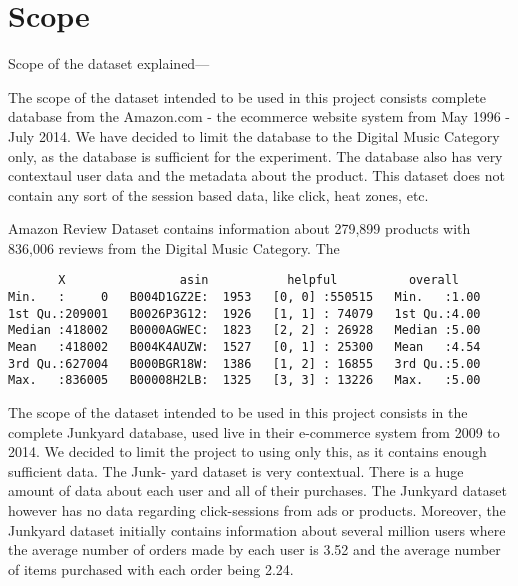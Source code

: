 \section{Scope}

Scope of the dataset explained---

The scope of the dataset intended to be used in this project consists complete database from the Amazon.com - the ecommerce website system from May 1996 - July 2014. We have decided to limit the database to the Digital Music Category only, as the database is sufficient for the experiment. The database also has very contextaul user data and the metadata about the product. This dataset does not contain any sort of the session based data, like click, heat zones, etc.

Amazon Review Dataset contains information about 279,899 products with 836,006 reviews from the Digital Music Category.
The   


\begin{verbatim}
       X                asin           helpful          overall    
Min.   :     0   B004D1GZ2E:  1953   [0, 0] :550515   Min.   :1.00  
1st Qu.:209001   B0026P3G12:  1926   [1, 1] : 74079   1st Qu.:4.00  
Median :418002   B0000AGWEC:  1823   [2, 2] : 26928   Median :5.00  
Mean   :418002   B004K4AUZW:  1527   [0, 1] : 25300   Mean   :4.54  
3rd Qu.:627004   B000BGR18W:  1386   [1, 2] : 16855   3rd Qu.:5.00  
Max.   :836005   B00008H2LB:  1325   [3, 3] : 13226   Max.   :5.00  
\end{verbatim}





The scope of the dataset intended to be used in this project consists in the complete
Junkyard database, used live in their e-commerce system from 2009 to 2014. We decided
to limit the project to using only this, as it contains enough sufficient data. The Junk-
yard dataset is very contextual. There is a huge amount of data about each user and all
of their purchases. The Junkyard dataset however has no data regarding click-sessions
from ads or products.
Moreover, the Junkyard dataset initially contains information about several million users
where the average number of orders made by each user is 3.52 and the average number
of items purchased with each order being 2.24.


